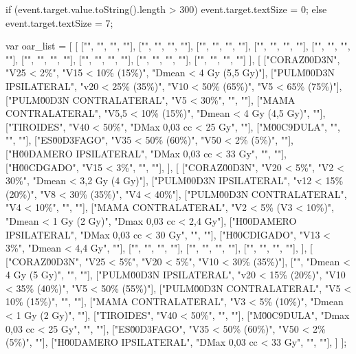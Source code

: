 		if (event.target.value.toString().length > 300) {
			event.target.textSize = 0;
		} else {
			event.target.textSize = 7;
		}
	\stopJScode


		var oar_list = [
			[
				["", "", "", ""], ["", "", "", ""], ["", "", "", ""], ["", "", "", ""], 
				["", "", "", ""], ["", "", "", ""], ["", "", "", ""], ["", "", "", ""], ["", "", "", ""]
			],
			[
				["CORAZ\u00D3N",              "V25 < 2\%",            "V15 < 10\% (15\%)",     "Dmean < 4 Gy (5,5 Gy)"], 
				["PULM\u00D3N IPSILATERAL",   "v20 < 25\% (35\%)",    "V10 < 50\% (65\%)",     "V5 < 65\% (75\%)"], 
				["PULM\u00D3N CONTRALATERAL", "V5 < 30\%",            "",                      ""], 	
				["MAMA CONTRALATERAL",        "V5,5 < 10\% (15\%)",   "Dmean < 4 Gy (4,5 Gy)", ""], 
				["TIROIDES", 						      "V40 < 50\%",           "DMax 0,03 cc < 25 Gy",  ""], 
				["M\u00C9DULA", 							"",                     "",                      ""], 
				["ES\u00D3FAGO", 						  "V35 < 50\% (60\%)",    "V50 < 2\% (5\%)",       ""], 
				["H\u00DAMERO IPSILATERAL",	  "DMax 0,03 cc < 33 Gy", "",                      ""], 
				["H\u00CDGADO", 							"V15 < 3\%",            "",                      ""], 
			], 
			[
				["CORAZ\u00D3N",            	"V20 < 5\%",            "V2 < 30\%",            "Dmean < 3,2 Gy (4 Gy)"], 
				["PULM\u00D3N IPSILATERAL",  	"v12 < 15\% (20\%)",    "V8 < 30\% (35\%)",     "V4 < 40\%"], 
				["PULM\u00D3N CONTRALATERAL", "V4 < 10\%",            "",                     ""], 
				["MAMA CONTRALATERAL",   			"V2 < 5\% (V3 < 10\%)", "Dmean < 1 Gy (2 Gy)",  "Dmax 0,03 cc < 2,4 Gy"], 
				["H\u00DAMERO IPSILATERAL",		"DMax 0,03 cc < 30 Gy", "",                     ""], 
				["H\u00CDIGADO", 							"V13 < 3\%",            "Dmean < 4,4 Gy",       ""], 
				["",                          "",                     "",                     ""],
				["",                          "",                     "",                     ""],
				["",                          "",                     "",                     ""],
			],
			[
				["CORAZ\u00D3N",              "V25 < 5\%",            "V20 < 5\%",             "V10 < 30\% (35\%)"],
				["",                          "Dmean < 4 Gy (5 Gy)",  "",                      ""],
				["PULM\u00D3N IPSILATERAL",   "v20 < 15\% (20\%)",    "V10 < 35\% (40\%)",     "V5 < 50\% (55\%)"],
				["PULM\u00D3N CONTRALATERAL", "V5 < 10\% (15\%)",     "",                      ""],
				["MAMA CONTRALATERAL",        "V3 < 5\% (10\%)",      "Dmean < 1 Gy (2 Gy)",   ""],
				["TIROIDES", 						      "V40 < 50\%",           "",                      ""],
				["M\u00C9DULA", 							"Dmax 0,03 cc < 25 Gy", "",                      ""],
				["ES\u00D3FAGO", 						  "V35 < 50\% (60\%)",    "V50 < 2\% (5\%)",       ""],
				["H\u00DAMERO IPSILATERAL",	  "DMax 0,03 cc < 33 Gy", "",                      ""],
			]
		];

